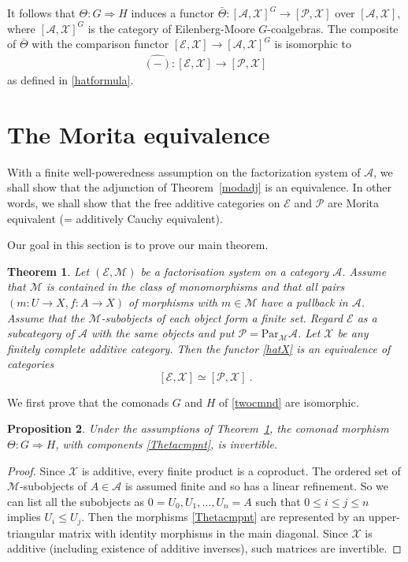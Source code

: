 \documentclass[a4paper,12pt,reqno]{amsart}
\newtheorem{theorem}{Theorem}[section] %
\newtheorem{proposition}[theorem]{Proposition}
\theoremstyle{definition}
\theoremstyle{fact}
\theoremstyle{genquest}
\theoremstyle{step}
\newcommand{\lra}{\longrightarrow}
\newcommand{\Lra}{\Longrightarrow}
\def\CA{{\mathscr A}}
\def\CE{{\mathscr E}}
\def\CM{{\mathscr M}}
\def\CP{{\mathscr P}}
\def\CX{{\mathscr X}}
\begin{document}
It follows that $\Theta :G\Lra H$
induces a functor $\bar{\Theta} : [\CA,\CX]^G \lra [\CP,\CX]$ over $[\CA,\CX]$, 
where $[\CA,\CX]^G$ is the category of Eilenberg-Moore $G$-coalgebras.  
The composite of $\bar{\Theta}$ with the comparison functor 
$[\CE,\CX] \lra [\CA,\CX]^G$ is isomorphic to  
\begin{eqnarray}\label{hatX}
\widehat{(-)} : [\CE, \CX] \lra [\CP, \CX]
\end{eqnarray}
as defined in \eqref{hatformula}.

\section{The Morita equivalence}

With a finite well-poweredness assumption on the factorization system of $\CA$, 
we shall show that the adjunction of Theorem~\ref{modadj} is an equivalence.
In other words, we shall show that the free additive categories on
$\CE$ and $\CP$ are Morita equivalent (= additively Cauchy equivalent).

Our goal in this section is to prove our main theorem.

\begin{theorem}\label{mainthm}
Let $(\CE,\CM)$ be a factorisation system on a category $\CA$.
Assume that $\CM$ is contained in the class of monomorphisms
and that all pairs $(m :U\rightarrow X,f:A\rightarrow X)$ of morphisms with $m\in \CM$
have a pullback in $\CA$. 
Assume that the $\CM$-subobjects of each object form a finite set.
Regard $\CE$ as a subcategory of $\CA$ with the same objects
and put $\CP = \mathrm{Par}_{\CM}\CA$. 
Let $\CX$ be any finitely complete additive category.
Then the functor \eqref{hatX} is an equivalence of categories
$$[\CE, \CX] \simeq [\CP, \CX] \ . $$
\end{theorem}

We first prove that the comonads $G$ and $H$ of \eqref{twocmnd} are isomorphic.

\begin{proposition}\label{invTheta}
Under the assumptions of Theorem~\ref{mainthm}, the comonad morphism
$\Theta : G\Lra H$, with components \eqref{Thetacmpnt}, is invertible.
\end{proposition}
\begin{proof}
Since $\CX$ is additive, every finite product is a coproduct.
The ordered set of $\CM$-subobjects of $A \in \CA$ is assumed finite
and so has a linear refinement. 
So we can list all the subobjects as $0=U_0, U_1, \dots , U_n = A$ 
such that $0\le i \le j \le n$ implies $U_i \le U_j$.
Then the morphisms \eqref{Thetacmpnt} are represented by an
upper-triangular matrix with identity morphisms in the main diagonal.
Since $\CX$ is additive (including existence of additive inverses), such
matrices are invertible.
\end{proof}
\end{document}
